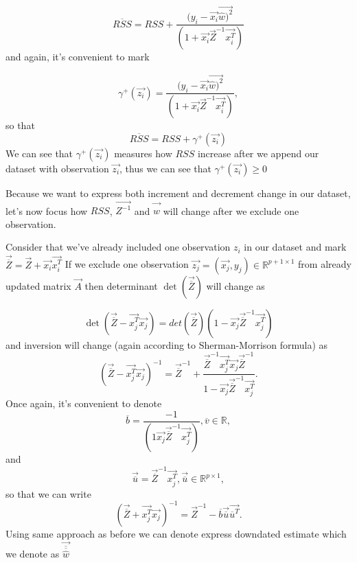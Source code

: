 \begin{equation}
	\overline{RSS} =  RSS + \dfrac{(y_i - \vec{x_i}\vec{\hat{w})^2}}{(1 + \vec{x_i}\vec{Z}^{-1}\vec{x_i^T})}
\end{equation}
and again, it's convenient to mark 

\begin{equation}
	\gamma^{+}(\vec{z_i}) = \dfrac{(y_i - \vec{x_i}\vec{\hat{w})^2}}{(1 + \vec{x_i}\vec{Z}^{-1}\vec{x_i^T})},
\end{equation}
so that 
\begin{equation}
	\overline{RSS} =  RSS + \gamma^{+}(\vec{z_i})
\end{equation}
We can see that $\gamma^{+}(\vec{z_i})$ measures how $RSS$ increase after we append our dataset with observation $\vec{z_i}$, thus we can see that $\gamma^{+}(\vec{z_i}) \geq 0$

Because we want to express both increment and decrement change in our dataset, let's now focus how $RSS$, $\vec{Z^{-1}}$ and $\vec{\hat{w}}$ will change after we exclude one observation. 

Consider that we've already included one observation $z_i$ in our dataset and mark $\vec{\overline{Z}} = \vec{Z} + \vec{x_i} \vec{x_i^T} $ If we exclude one observation $\vec{z_j} = (\vec{x_j}, y_j) \in \mathbb{R}^{p+1 \times 1} $ from already updated matrix $\vec{A}$ then determinant $\det(\vec{\overline{Z}})$  will change as

\begin{equation} 
	\det(\vec{\overline{Z}} - \vec{x_j^T}\vec{x_j}) = det(\vec{\overline{Z}})(1 - \vec{x_j}\vec{\overline{Z}}^{-1}\vec{x_j^T})
\end{equation}
and inversion will change (again according to Sherman-Morrison formula) as 
\begin{equation}  \label{updatedinversion2}
	(\vec{\overline{Z}} - \vec{x_j^T}\vec{x_j})^{-1} = \vec{\overline{Z}}^{-1} + \dfrac{\vec{\overline{Z}}^{-1}\vec{x_j^T}\vec{x_j}\vec{\overline{Z}}^{-1}}{1 - \vec{x_j}\vec{\overline{Z}}^{-1}\vec{x_j^T}}.
\end{equation}
Once again, it's convenient to denote
\begin{equation}
	\overline{b} = \dfrac{-1}{(1  \vec{x_j}\vec{\overline{Z}}^{-1}\vec{x_j^T})},  \overline{v} \in \mathbb{R},
\end{equation}
and 
\begin{equation}
	\vec{\overline{u}} = \vec{\overline{Z}}^{-1}\vec{x_j^T},  	\vec{\overline{u}} \in \mathbb{R}^{p \times 1},
\end{equation}
so that we can write
\begin{equation}
	(\vec{\overline{Z}} + \vec{x_j^T}\vec{x_j})^{-1} = \vec{Z}^{-1} - \overline{b}\vec{\overline{u}}\vec{\overline{u}^T}.
\end{equation}
Using same approach as before we can denote express downdated estimate which we denote as $\vec{\overline{\overline{\hat{w}}}}$

